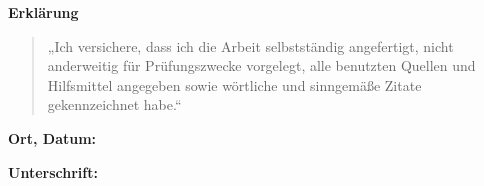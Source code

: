 \thispagestyle{plain}
\begin{center}
  \textbf{\Large Erklärung}
\end{center}

\begin{quote}
„Ich versichere, dass ich die Arbeit selbstständig angefertigt, nicht anderweitig für 
Prüfungszwecke vorgelegt, alle benutzten Quellen und Hilfsmittel angegeben sowie 
wörtliche und sinngemäße Zitate gekennzeichnet habe.“
\end{quote}

\vfill

\noindent
\begin{minipage}[t]{0.45\textwidth}
\textbf{Ort, Datum:} \hrulefill
\end{minipage}%
\hfill
\begin{minipage}[t]{0.45\textwidth}
\textbf{Unterschrift:} \hrulefill
\end{minipage}
